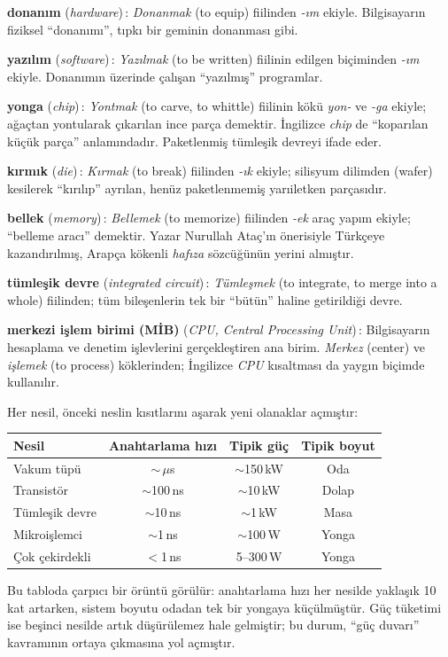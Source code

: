\begin{terimnotu}
\textbf{donanım} (\emph{hardware})\,: \emph{Donanmak} (to equip) fiilinden \emph{-ım} ekiyle. Bilgisayarın fiziksel ``donanımı'', tıpkı bir geminin donanması gibi.

\textbf{yazılım} (\emph{software})\,: \emph{Yazılmak} (to be written) fiilinin edilgen biçiminden \emph{-ım} ekiyle. Donanımın üzerinde çalışan ``yazılmış'' programlar.

\textbf{yonga} (\emph{chip})\,: \emph{Yontmak} (to carve, to whittle) fiilinin kökü \emph{yon-} ve \emph{-ga} ekiyle; ağaçtan yontularak çıkarılan ince parça demektir. İngilizce \emph{chip} de ``koparılan küçük parça'' anlamındadır. Paketlenmiş tümleşik devreyi ifade eder.

\textbf{kırmık} (\emph{die})\,: \emph{Kırmak} (to break) fiilinden \emph{-ık} ekiyle; silisyum dilimden (wafer) kesilerek ``kırılıp'' ayrılan, henüz paketlenmemiş yarıiletken parçasıdır.

\textbf{bellek} (\emph{memory})\,: \emph{Bellemek} (to memorize) fiilinden \emph{-ek} araç yapım ekiyle; ``belleme aracı'' demektir. Yazar Nurullah Ataç'ın önerisiyle Türkçeye kazandırılmış, Arapça kökenli \emph{hafıza} sözcüğünün yerini almıştır.

\textbf{tümleşik devre} (\emph{integrated circuit})\,: \emph{Tümleşmek} (to integrate, to merge into a whole) fiilinden; tüm bileşenlerin tek bir ``bütün'' haline getirildiği devre.

\textbf{merkezi işlem birimi (MİB)} (\emph{CPU, Central Processing Unit})\,: Bilgisayarın hesaplama ve denetim işlevlerini gerçekleştiren ana birim. \emph{Merkez} (center) ve \emph{işlemek} (to process) köklerinden; İngilizce \emph{CPU} kısaltması da yaygın biçimde kullanılır.
\end{terimnotu}

\begin{karsilastirma}
Her nesil, önceki neslin kısıtlarını aşarak yeni olanaklar açmıştır:

\begin{center}
\small
\begin{tabular}{lccc}
\toprule
\textbf{Nesil} & \textbf{Anahtarlama hızı} & \textbf{Tipik güç} & \textbf{Tipik boyut} \\
\midrule
Vakum tüpü & $\sim$\,$\mu$s & $\sim$150\,kW & Oda \\
Transistör & $\sim$100\,ns & $\sim$10\,kW & Dolap \\
Tümleşik devre & $\sim$10\,ns & $\sim$1\,kW & Masa \\
Mikroişlemci & $\sim$1\,ns & $\sim$100\,W & Yonga \\
Çok çekirdekli & $<$1\,ns & 5--300\,W & Yonga \\
\bottomrule
\end{tabular}
\end{center}

Bu tabloda çarpıcı bir örüntü görülür: anahtarlama hızı her nesilde yaklaşık 10 kat artarken, sistem boyutu odadan tek bir yongaya küçülmüştür. Güç tüketimi ise beşinci nesilde artık düşürülemez hale gelmiştir; bu durum, ``güç duvarı'' kavramının ortaya çıkmasına yol açmıştır.
\end{karsilastirma}

